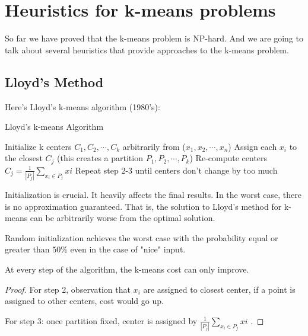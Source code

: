 \section{Heuristics for k-means problems}

So far we have proved that the k-means problem is NP-hard. And we are going to talk about several heuristics that provide approaches to the k-means problem.

\subsection{Lloyd's Method}

Here's Lloyd's k-means algorithm (1980's):
\begin{algorithm}[H]
  \caption{Lloyd's k-means Algorithm}
  \label{ladder-mechanism}
  \begin{algorithmic}[1]
    \renewcommand\algorithmicrequire{\textbf{input}}     
    \STATE Initialize k centers $C_1, C_2, \cdots, C_k$ arbitrarily
    from ($x_1,x_2, \cdots , x_n$)  
    \STATE Assign each $x_i$ to the closest $C_j$ (this creates a
    partition $P_1, P_2, \cdots, P_k$) 
    \STATE Re-compute centers $C_j=\frac{1}{|P_j|} \sum_{x_i\in P_j} xi$
    \STATE Repeat step 2-3 until centers don't change by too much    
  \end{algorithmic}
\end{algorithm}

\begin{fact}
  Initialization is crucial. It heavily affects the final results. In the worst case, there is no approximation guaranteed. That is, the solution to Lloyd's method for k-means can be arbitrarily worse from the optimal solution.
\end{fact}

\begin{fact}
  Random initialization achieves the worst case with the probability equal or greater than $50\%$ even in the case of "nice" input.
\end{fact}

\begin{lemma}
  At every step of the algorithm, the k-means cost can only improve.
\end{lemma}
\begin{proof}
  For step 2, observation that $x_i$ are assigned to closest center,
  if a point is assigned to other centers, cost would go up.
  
  For step 3: once partition fixed, center is assigned by
  $\frac{1}{|P_j|} \sum_{x_i\in P_j} xi$ .
\end{proof}




